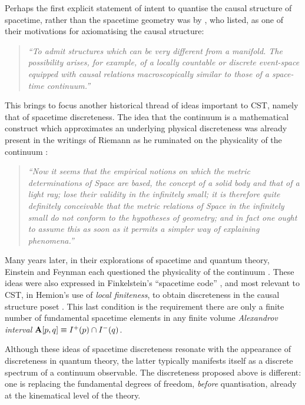 Perhaps the first explicit  statement of intent to quantise the {causal structure} of spacetime, rather than the
spacetime geometry was  by \cite{kp},
who listed, as one of their motivations for axiomatising the causal structure:
\begin{quote}
\textit{``To admit structures which can be very different from a
  manifold. The possibility arises, for example, of a locally
  countable or discrete event-space equipped with causal relations macroscopically similar to those of a space-time continuum.''
}
\end{quote}  


This brings to focus  another historical thread of ideas 
important to CST, namely that  of spacetime discreteness.   
The idea  that  the  continuum is a  mathematical
construct which approximates an underlying physical discreteness was already
present in the writings of Riemann as he ruminated on the physicality of the continuum \citep{Riemann}:
\begin{quote}
\textit{``Now it seems that the empirical notions on which the metric determinations of  Space are based, the concept of a
  solid body and that of a light ray; lose their validity in the infinitely small; it is therefore quite definitely
  conceivable that the metric relations of Space in the infinitely small do not conform to the hypotheses of  geometry;
  and in fact one ought to assume this as soon as it permits a simpler way of explaining phenomena.''} 
\end{quote}

Many years later, in their explorations of spacetime and quantum theory, Einstein and Feynman
each questioned the physicality of the continuum \citep{Einstein,Feynman}.  
These ideas were also expressed in Finkelstein's  ``spacetime code'' \citep{finkelstein}, and most relevant to CST, in
Hemion's use of \emph{local finiteness},   to obtain discreteness in the causal
structure poset 
\citep{hemion}.  This last condition is the  requirement there are only a finite number of fundamental spacetime 
elements  in any finite volume  \emph{Alexandrov interval} $\mathbf A[p,q]\equiv I^+(p)\cap I^-(q)$. 



Although these ideas of spacetime discreteness resonate with the appearance of discreteness in quantum theory, 
the latter  typically manifests itself as  a discrete spectrum of  a continuum observable. The discreteness
proposed above is different: one is replacing the fundamental degrees of
freedom, \emph{before} quantisation, already  at the kinematical
level of the theory. 


